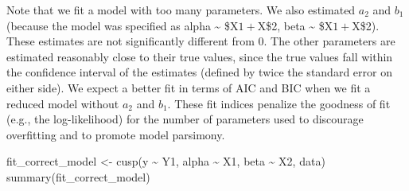 \documentclass[
  a4paper,
  DIV=11,
  numbers=noendperiod,
  oneside]{scrreprt}
\newenvironment{Shaded}{}{}
\newcommand{\FunctionTok}[1]{\textcolor[rgb]{0.44,0.26,0.76}{#1}}
\newcommand{\NormalTok}[1]{\textcolor[rgb]{0.14,0.16,0.18}{#1}}
\newcommand{\OtherTok}[1]{\textcolor[rgb]{0.44,0.26,0.76}{#1}}
\newcommand{\SpecialCharTok}[1]{\textcolor[rgb]{0.00,0.36,0.77}{#1}}
\begin{document}
Note that we fit a model with too many parameters. We also estimated
\(a_{2}\) and \(b_{1}\) (because the model was specified as alpha
\textasciitilde{} \$X\(1+\)X\$2, beta \textasciitilde{} \$X\(1+\)X\$2).
These estimates are not significantly different from 0. The other
parameters are estimated reasonably close to their true values, since
the true values fall within the confidence interval of the estimates
(defined by twice the standard error on either side). We expect a better
fit in terms of AIC and BIC when we fit a reduced model without
\(a_{2}\) and \(b_{1}\). These fit indices penalize the goodness of fit
(e.g., the log-likelihood) for the number of parameters used to
discourage overfitting and to promote model parsimony.

\begin{Shaded}
\begin{Highlighting}[]
\NormalTok{fit\_correct\_model }\OtherTok{\textless{}{-}} \FunctionTok{cusp}\NormalTok{(y }\SpecialCharTok{\textasciitilde{}}\NormalTok{ Y1, alpha }\SpecialCharTok{\textasciitilde{}}\NormalTok{ X1, beta }\SpecialCharTok{\textasciitilde{}}\NormalTok{ X2, data) }
\FunctionTok{summary}\NormalTok{(fit\_correct\_model)}
\end{Highlighting}
\end{Shaded}
\end{document}
